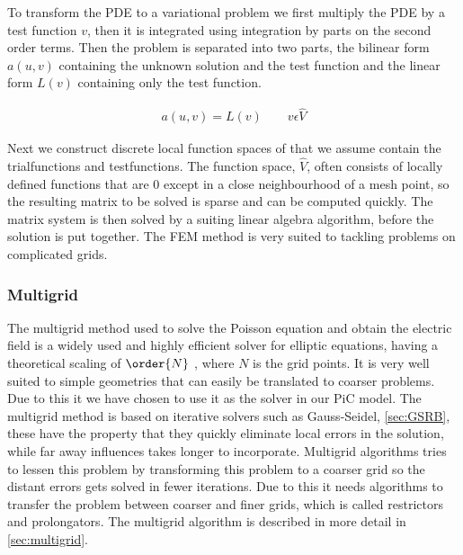     	To transform the PDE to a variational problem we first multiply the PDE by a
    	test function \(v\), then it is integrated using integration by parts on the
    	second order terms. Then the problem is separated into two parts, the bilinear
    	form \(a(u,v)\) containing the unknown solution and the test function and the
    	linear form \(L(v)\) containing only the test function.

    	\begin{align}
    		a(u,v) = L(v)	\qquad v\epsilon \hat{V}
    	\end{align}


    	Next we construct discrete local function spaces of that we assume contain
    	the trialfunctions and testfunctions. The function space, \(\hat{V}\), often consists of
    	locally defined functions that are \(0\) except in a close neighbourhood of
    	a mesh point, so the resulting matrix to be solved is sparse and can be computed
    	quickly. The matrix system is then solved by a suiting linear algebra algorithm,
    	before the solution is put together. The FEM method is very suited to tackling problems
        on complicated grids.

    \subsubsection{Multigrid}

        The multigrid method used to solve the Poisson equation and obtain the
        electric field is a widely used and highly efficient solver for elliptic equations,
        having a theoretical scaling of \(\order{N}\) \citep{press_numerical_1988},
        where \(N\) is the grid points. It is very well suited to simple geometries
        that can easily be translated to coarser problems. Due to this it we have chosen
        to use it as the solver in our PiC model.
        The multigrid method is based on iterative
        solvers such as Gauss-Seidel, \cref{sec:GSRB}, these have the property
        that they quickly eliminate local errors in the solution, while far
        away influences takes longer to incorporate. Multigrid algorithms tries
        to lessen this problem by transforming this problem to a coarser grid
        so the distant errors gets solved in fewer iterations. Due to this it needs
        algorithms to transfer the problem between coarser and finer grids, which
        is called restrictors and prolongators. The multigrid algorithm is described in
        more detail in \cref{sec:multigrid}.
